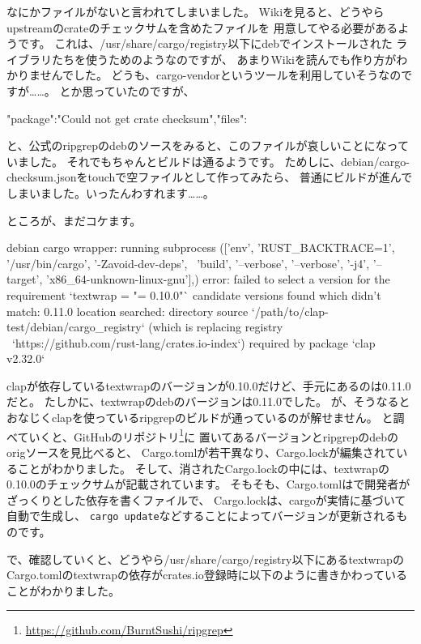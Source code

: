 \documentclass[mingoth,a4paper]{jsarticle}
\begin{document}
なにかファイルがないと言われてしまいました。
Wikiを見ると、どうやらupstreamのcrateのチェックサムを含めたファイルを
用意してやる必要があるようです。
これは、/usr/share/cargo/registry以下にdebでインストールされた
ライブラリたちを使うためのようなのですが、
あまりWikiを読んでも作り方がわかりませんでした。
どうも、cargo-vendorというツールを利用していそうなのですが……。
とか思っていたのですが、

\begin{commandline}
{"package":"Could not get crate checksum","files":{}}
\end{commandline}

と、公式のripgrepのdebのソースをみると、このファイルが哀しいことになっていました。
それでもちゃんとビルドは通るようです。
ためしに、debian/cargo-checksum.jsonをtouchで空ファイルとして作ってみたら、
普通にビルドが進んでしまいました。いったんわすれます……。

ところが、まだコケます。

\begin{commandline}
debian cargo wrapper: running subprocess (['env', 'RUST_BACKTRACE=1', '/usr/bin/cargo', '-Zavoid-dev-deps', \
'build', '--verbose', '--verbose', '-j4', '--target', 'x86_64-unknown-linux-gnu'],) {}
error: failed to select a version for the requirement `textwrap = "= 0.10.0"`
candidate versions found which didn't match: 0.11.0
location searched: directory source `/path/to/clap-test/debian/cargo_registry` (which is replacing registry \
`https://github.com/rust-lang/crates.io-index`)
required by package `clap v2.32.0`
\end{commandline}

clapが依存しているtextwrapのバージョンが0.10.0だけど、手元にあるのは0.11.0だと。
たしかに、textwrapのdebのバージョンは0.11.0でした。
が、そうなるとおなじくclapを使っているripgrepのビルドが通っているのが解せません。
と調べていくと、GitHubのリポジトリ\footnote{\url{https://github.com/BurntSushi/ripgrep}}に
置いてあるバージョンとripgrepのdebのorigソースを見比べると、
Cargo.tomlが若干異なり、Cargo.lockが編集されていることがわかりました。
そして、消されたCargo.lockの中には、textwrapの0.10.0のチェックサムが記載されています。
そもそも、Cargo.tomlはで開発者がざっくりとした依存を書くファイルで、
Cargo.lockは、cargoが実情に基づいて自動で生成し、
\verb|cargo update|などすることによってバージョンが更新されるものです。

で、確認していくと、どうやら/usr/share/cargo/registry以下にあるtextwrapの
Cargo.tomlのtextwrapの依存がcrates.io登録時に以下のように書きかわっていることがわかりました。
\end{document}
